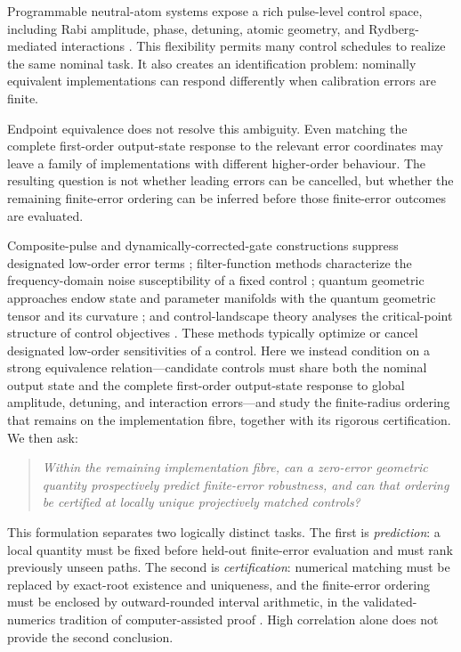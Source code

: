 \documentclass[11pt]{article}
\begin{document}
Programmable neutral-atom systems expose a rich pulse-level control space,
including Rabi amplitude, phase, detuning, atomic geometry, and
Rydberg-mediated interactions
\cite{Silverio2022,Henriet2020,Saffman2016}. This flexibility permits many
control schedules to realize the same nominal task. It also creates an
identification problem: nominally equivalent implementations can respond
differently when calibration errors are finite.

Endpoint equivalence does not resolve this ambiguity. Even matching the
complete first-order output-state response to the relevant error coordinates
may leave a family of implementations with different higher-order behaviour.
The resulting question is not whether leading errors can be cancelled, but
whether the remaining finite-error ordering can be inferred before those
finite-error outcomes are evaluated.

Composite-pulse and dynamically-corrected-gate constructions suppress
designated low-order error terms
\cite{Wimperis1994,Kukita2022,Barnes2015,Khaneja2005,Vandersypen2005,Khodjasteh2009};
filter-function methods characterize the frequency-domain noise
susceptibility of a fixed control \cite{Green2013}; quantum geometric
approaches endow state and parameter manifolds with the quantum geometric
tensor and its curvature \cite{Provost1980}; and control-landscape theory
analyses the critical-point structure of control objectives
\cite{Rabitz2004,Chakrabarti2007}. These methods typically optimize or
cancel designated low-order sensitivities of a control. Here we instead
condition on a strong equivalence relation---candidate controls must share
both the nominal output state and the complete first-order output-state
response to global amplitude, detuning, and interaction errors---and study
the finite-radius ordering that remains on the implementation fibre,
together with its rigorous certification. We then ask:
\begin{quote}
\emph{Within the remaining implementation fibre, can a zero-error geometric
quantity prospectively predict finite-error robustness, and can that ordering
be certified at locally unique projectively matched controls?}
\end{quote}

This formulation separates two logically distinct tasks. The first is
\emph{prediction}: a local quantity must be fixed before held-out finite-error
evaluation and must rank previously unseen paths. The second is
\emph{certification}: numerical matching must be replaced by exact-root
existence and uniqueness, and the finite-error ordering must be enclosed by
outward-rounded interval arithmetic, in the validated-numerics tradition of
computer-assisted proof \cite{Lanford1982,Tucker2002,vandenBerg2015}. High
correlation alone does not provide the second conclusion.
\end{document}
